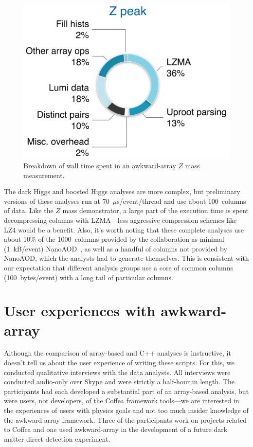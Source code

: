 \documentclass[a4paper]{jpconf}
\begin{document}
\begin{figure}
\begin{center}
\includegraphics[width=0.35\linewidth]{zpeak-performance-breakdown.png}
\end{center}

\caption{Breakdown of wall time spent in an awkward-array $Z$ mass measurement. \label{fig:zpeak}}
\end{figure}

The dark Higgs and boosted Higgs analyses are more complex, but preliminary versions of these analyses run at 70~$\mu$s/event/thread and use about 100~columns of data. Like the $Z$ mass demonstrator, a large part of the execution time is spent decompressing columns with LZMA---less aggressive compression schemes like LZ4 would be a benefit. Also, it's worth noting that these complete analyses use about 10\% of the 1000~columns provided by the collaboration as minimal (1~kB/event) NanoAOD~\cite{nanoaod}, as well as a handful of columns not provided by NanoAOD, which the analysts had to generate themselves. This is consistent with our expectation that different analysis groups use a core of common columns (100~bytes/event) with a long tail of particular columns.

\section{User experiences with awkward-array}

Although the comparison of array-based and C++ analyses is instructive, it doesn't tell us about the user experience of writing these scripts. For this, we conducted qualitative interviews with the data analysts. All interviews were conducted audio-only over Skype and were strictly a half-hour in length. The participants had each developed a substantial part of an array-based analysis, but were users, not developers, of the Coffea framework tools---we are interested in the experiences of users with physics goals and not too much insider knowledge of the awkward-array framework. Three of the participants work on projects related to Coffea and one used awkward-array in the development of a future dark matter direct detection experiment.
\end{document}

